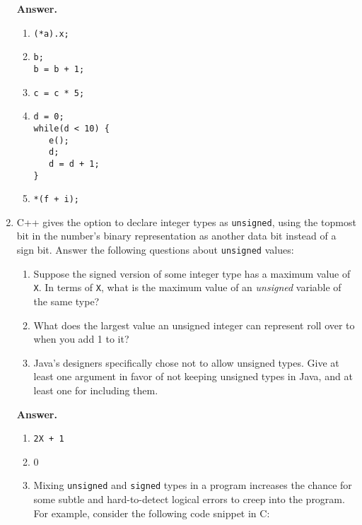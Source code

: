 \documentclass[9pt]{article}
\begin{document}
\begin{enumerate}
      \textbf{Answer.}

      \begin{enumerate}
         \item \verb|(*a).x;|
         \item \verb|b;| \\
               \verb|b = b + 1;|
         \item \verb|c = c * 5;|
         \item \verb|d = 0;| \\
               \verb|while(d < 10) {| \\
               \verb|   e();| \\
               \verb|   d;| \\
               \verb|   d = d + 1;| \\
               \verb|}|
         \item \verb|*(f + i);|
      \end{enumerate}
   \item C++ gives the option to declare integer types as \verb|unsigned|, using
         the topmost bit in the number's binary representation as another data
         bit instead of a sign bit. Answer the following questions about
         \verb|unsigned| values:
         \begin{enumerate}
            \item Suppose the signed version of some integer type has a maximum
                  value of \verb|X|. In terms of \verb|X|, what is the maximum
                  value of an \textit{unsigned} variable of the same type?
            \item What does the largest value an unsigned integer can represent
                  roll over to when you add 1 to it?
            \item Java's designers specifically chose not to allow unsigned
                  types. Give at least one argument in favor of not keeping
                  unsigned types in Java, and at least one for including them.
         \end{enumerate}

      \textbf{Answer.}

      \begin{enumerate}
         \item \verb|2X + 1|
         \item 0
         \item Mixing \verb|unsigned| and \verb|signed| types in a program
               increases the chance for some subtle and hard-to-detect logical 
               errors to creep into the program. For example, consider the
               following code snippet in C: \\


\end{enumerate}
\end{enumerate}
\end{document}
